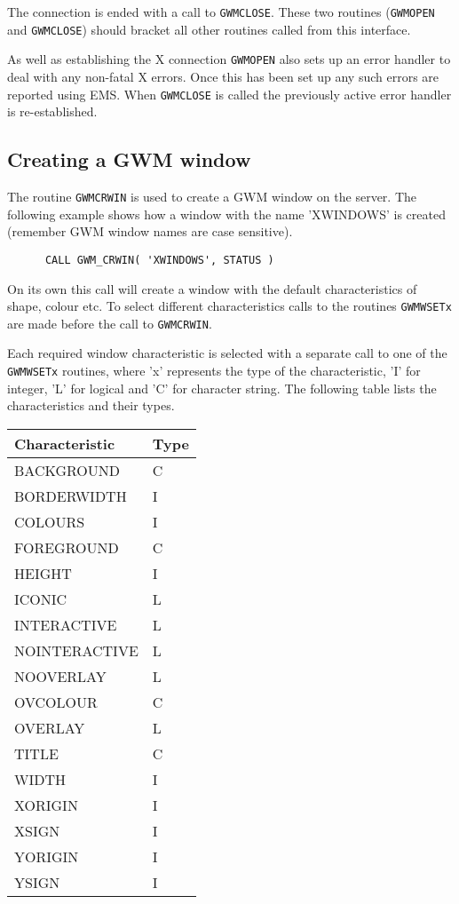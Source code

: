 \documentclass[twoside,11pt]{article}
\newcommand{\htmlref}[2]{#1}
\renewcommand{\_}{\texttt{\symbol{95}}}
\begin{document}
The connection is ended with a call to 
\texttt{\htmlref{GWM\_CLOSE}{GWM_CLOSE}}.
These two routines
({\tt GWM\_OPEN} and {\tt GWM\_CLOSE}) should bracket all other routines
called from this interface.

As well as establishing the X connection {\tt GWM\_OPEN} also sets up
an error handler to deal with any non-fatal X errors. Once this has been
set up any such errors are reported using EMS. When {\tt GWM\_CLOSE} is
called the previously active error handler is re-established.

\subsection{Creating a GWM window}
The routine \texttt{\htmlref{GWM\_CRWIN}{GWM_CRWIN}}
is used to create a GWM window on the
server. The following example shows how a window with the name 'XWINDOWS'
is created (remember GWM window names are case sensitive).
\begin{verbatim}
      CALL GWM_CRWIN( 'XWINDOWS', STATUS )
\end{verbatim}
On its own this call will create a window with the default characteristics
of shape, colour etc. To select different characteristics calls to the
routines \texttt{\htmlref{GWM\_WSETx}{GWM_WSETC}} are made before 
the call to {\tt GWM\_CRWIN}.

Each required window characteristic is selected with a separate call to
one of the {\tt GWM\_WSETx} routines, where 'x' represents the type of
the characteristic, 'I' for integer, 'L' for logical and 'C' for character
string. The following table lists the characteristics and their types.

\begin{center}
\begin{tabular}{|l|l|}   \hline
Characteristic & Type \\ \hline
BACKGROUND     & C    \\
BORDERWIDTH    & I    \\
COLOURS        & I    \\
FOREGROUND     & C    \\
HEIGHT         & I    \\
ICONIC         & L    \\
INTERACTIVE    & L    \\
NOINTERACTIVE  & L    \\
NOOVERLAY      & L    \\
OVCOLOUR       & C    \\
OVERLAY        & L    \\
TITLE          & C    \\ 
WIDTH          & I    \\
XORIGIN        & I    \\
XSIGN          & I    \\
YORIGIN        & I    \\
YSIGN          & I    \\ \hline
\end{tabular}
\end{center}
\end{document}
